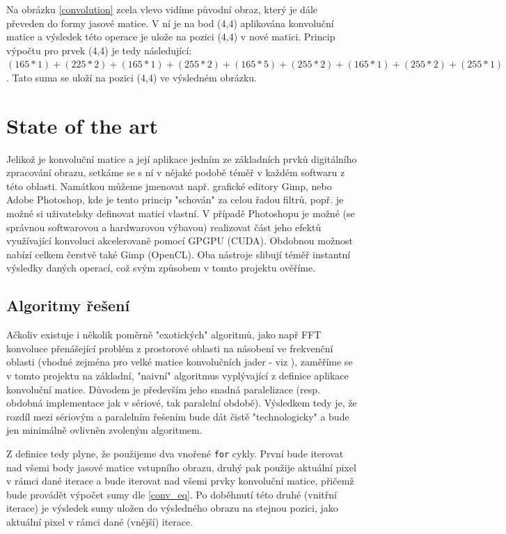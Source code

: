 \documentclass[10pt,a4paper]{article}
\begin{document}
Na obrázku \ref{convolution} zcela vlevo vidíme původní obraz, který je dále převeden do formy jasové matice. V ní je na bod (4,4) aplikována konvoluční matice a výsledek této operace je ulože na pozici (4,4) v nové matici. Princip výpočtu pro prvek (4,4) je tedy následující: $(165*1)+(225*2)+(165*1)+(255*2)+(165*5)+(255*2)+(165*1)+(255*2)+(255*1)$. Tato suma se uloží na pozici (4,4) ve výsledném obrázku.

\section{State of the art}

Jelikož je konvoluční matice a její aplikace jedním ze základních prvků digitálního zpracování obrazu, setkáme se s ní v nějaké podobě téměř v každém softwaru z této oblasti. Namátkou můžeme jmenovat např. grafické editory Gimp, nebo Adobe Photoshop, kde je tento princip "schován" za celou řadou filtrů, popř. je možné si uživatelsky definovat matici vlastní. V případě Photoshopu je možné (se správnou softwarovou a hardwarovou výbavou) realizovat část jeho efektů využívající konvoluci akcelerovaně pomocí GPGPU (CUDA). Obdobnou možnost nabízí celkem čerstvě také Gimp (OpenCL). Oba nástroje slibují téměř instantní výsledky daných operací, což svým způsobem v tomto projektu ověříme.

\subsection{Algoritmy řešení}

Ačkoliv existuje i několik poměrně "exotických" algoritmů, jako např FFT konvoluce přenášející problém z prostorové oblasti na násobení ve frekvenční oblasti (vhodné zejména pro velké matice konvolučních jader - viz \cite{dzo2}), zaměříme se v tomto projektu na základní, "naivní" algoritmus vyplývající z definice aplikace konvoluční matice. Důvodem je především jeho snadná paralelizace (resp. obdobná implementace jak v sériové, tak paralelní obdobě). Výsledkem tedy je, že rozdíl mezi sériovým a paralelním řešením bude dát čistě "technologicky" a bude jen minimálně ovlivněn zvoleným algoritmem.

Z definice tedy plyne, že použijeme dva vnořené \verb|for| cykly. První bude iterovat nad všemi body jasové matice vstupního obrazu, druhý pak použije aktuální pixel v rámci dané iterace a bude iterovat nad všemi prvky konvoluční matice, přičemž bude provádět výpočet sumy dle \ref{conv_eq}. Po doběhnutí této druhé (vnitřní iterace) je výsledek sumy uložen do výsledného obrazu na stejnou pozici, jako aktuální pixel v rámci dané (vnější) iterace.
\end{document}
